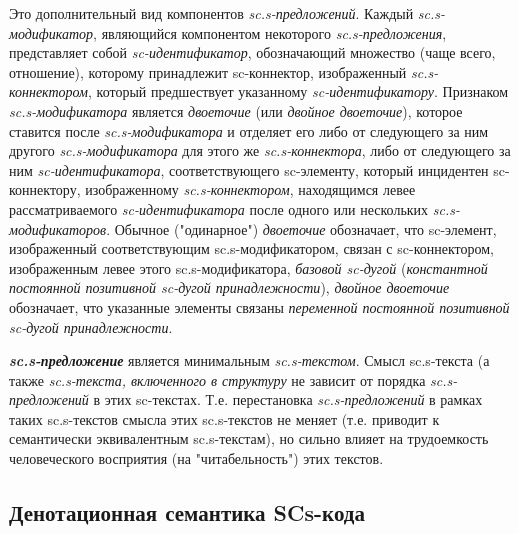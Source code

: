 \begin{SCn}
Это дополнительный вид компонентов \textit{sc.s-предложений}. Каждый \textit{sc.s-модификатор}, являющийся компонентом некоторого \textit{sc.s-предложения}, представляет собой \textit{sc-идентификатор}, обозначающий множество (чаще всего, отношение), которому принадлежит sc-коннектор, изображенный \textit{sc.s-коннектором}, который предшествует указанному \textit{sc-идентификатору}. Признаком \textit{sc.s-модификатора} является \textit{двоеточие} (или \textit{двойное двоеточие}), которое ставится после \textit{sc.s-модификатора} и отделяет его либо от следующего за ним другого \textit{sc.s-модификатора} для этого же \textit{sc.s-коннектора}, либо от следующего за ним \textit{sc-идентификатора}, соответствующего sc-элементу, который инцидентен sc-коннектору, изображенному \textit{sc.s-коннектором}, находящимся левее рассматриваемого \textit{sc-идентификатора} после одного или нескольких \textit{sc.s-модификаторов}. Обычное ("одинарное") \textit{двоеточие} обозначает, что sc-элемент, изображенный соответствующим \mbox{sc.s-модификатором}, связан с sc-коннектором, изображенным левее этого \mbox{sc.s-модификатора}, \textit{базовой \mbox{sc-дугой}} (\textit{константной постоянной позитивной \mbox{sc-дугой} принадлежности}), \textit{двойное двоеточие} обозначает, что указанные элементы связаны \textit{переменной постоянной позитивной \mbox{sc-дугой} принадлежности}.

\end{SCn}

\textbf{\textit{sc.s-предложение}} является минимальным \textit{sc.s-текстом}. Смысл sc.s-текста (а также \textit{sc.s-текста, включенного в структуру} не зависит от порядка \textit{\mbox{sc.s-предложений}} в этих sc-текстах. Т.е. перестановка \textit{\mbox{sc.s-предложений}} в рамках таких \mbox{sc.s-текстов} смысла этих \mbox{sc.s-текстов} не меняет (т.е. приводит к семантически эквивалентным \mbox{sc.s-текстам}), но сильно влияет на трудоемкость человеческого восприятия (на "читабельность") этих текстов.


\newpage
\subsection{Денотационная семантика SCs-кода}

